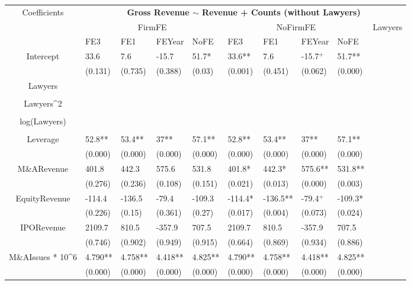 \documentclass{article}
\begin{document}
\begin{table}[H]
\centering
\begin{tabular}{|clllllllll|}
\hline
\multirow{3}{*}{Coefficients} & \multicolumn{9}{c|}{\textbf{Gross Revenue $\sim$ Revenue + Counts (without Lawyers)}} \\
\cline{2-10}
& \multicolumn{4}{c}{FirmFE} & \multicolumn{4}{c}{NoFirmFE} & \multirow{2}{*}{Lawyers} \\
\cline{2-9}
& FE3 & FE1 & FEYear & NoFE & FE3 & FE1 & FEYear & NoFE &  \\
\hline
 
Intercept & 33.6 & 7.6 & -15.7 & 51.7* & 33.6** & 7.6 & -15.7$^{+}$ & 51.7** & \\ 
   & (0.131) & (0.735) & (0.388) & (0.03) & (0.001) & (0.451) & (0.062) & (0.000) & \\ 
  Lawyers &  &  &  &  &  &  &  &  & \\ 
   &  &  &  &  &  &  &  &  & \\ 
  Lawyers^2 &  &  &  &  &  &  &  &  & \\ 
   &  &  &  &  &  &  &  &  & \\ 
  log(Lawyers) &  &  &  &  &  &  &  &  & \\ 
   &  &  &  &  &  &  &  &  & \\ 
  Leverage & 52.8** & 53.4** & 37** & 57.1** & 52.8** & 53.4** & 37** & 57.1** & \\ 
   & (0.000) & (0.000) & (0.000) & (0.000) & (0.000) & (0.000) & (0.000) & (0.000) & \\ 
  M\&ARevenue & 401.8 & 442.3 & 575.6 & 531.8 & 401.8* & 442.3* & 575.6** & 531.8** & \\ 
   & (0.276) & (0.236) & (0.108) & (0.151) & (0.021) & (0.013) & (0.000) & (0.003) & \\ 
  EquityRevenue & -114.4 & -136.5 & -79.4 & -109.3 & -114.4* & -136.5** & -79.4$^{+}$ & -109.3* & \\ 
   & (0.226) & (0.15) & (0.361) & (0.27) & (0.017) & (0.004) & (0.073) & (0.024) & \\ 
  IPORevenue & 2109.7 & 810.5 & -357.9 & 707.5 & 2109.7 & 810.5 & -357.9 & 707.5 & \\ 
   & (0.746) & (0.902) & (0.949) & (0.915) & (0.664) & (0.869) & (0.934) & (0.886) & \\ 
  M\&AIssues * 10^6 & 4.790** & 4.758** & 4.418** & 4.825** & 4.790** & 4.758** & 4.418** & 4.825** & \\ 
   & (0.000) & (0.000) & (0.000) & (0.000) & (0.000) & (0.000) & (0.000) & (0.000) & \\ 

\end{tabular}
\end{table}
\end{document}
